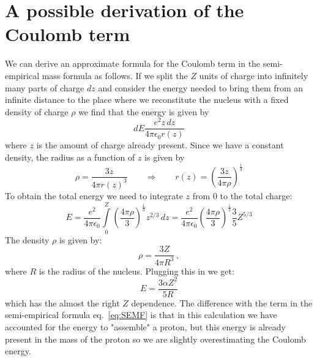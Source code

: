 \documentclass[12pt]{article}
\begin{document}
\section{A possible derivation of the Coulomb term}
We can derive an approximate formula for the Coulomb term in the semi-empirical mass formula as follows. If we split the $Z$ units of charge into infinitely many parts of charge $dz$ and consider the energy needed to bring them from an infinite distance to the place where we reconstitute the nucleus with a fixed density of charge $\rho$ we find that the energy is given by 
\[dE\frac{e^2 z\,dz}{4\pi\epsilon_0 r(z)}\]
where $z$ is the amount of charge already present. Since we have a constant density, the radius as a function of $z$ is given by
\[\rho=\frac{3 z}{4\pi r(z)^3}\qquad \Rightarrow \qquad r(z)=\left(\frac{3z}{4\pi\rho}\right)^{\frac{1}{3}}\]
To obtain the total energy we need to integrate $z$ from 0 to the total charge:
\[E=\frac{e^2}{4\pi\epsilon_0}\int\limits_0^{Z}\left(\frac{4\pi\rho}{3}\right)^{\frac{1}{3}}z^{2/3}\,dz=\frac{e^2}{4\pi\epsilon_0} \left(\frac{4\pi\rho}{3}\right)^{\frac{1}{3}}\frac{3}{5}Z^{5/3}\] 
The density $\rho$ is given by:
\[\rho=\frac{3Z}{4\pi R^3}\,,\]
where $R$ is the radius of the nucleus. Plugging this in we get:
\[E=\frac{3\alpha Z^2}{5 R}\] 
which has the almost the right $Z$ dependence. The difference with the term in the semi-empirical formula eq.~\ref{eq:SEMF} is that in this calculation we have accounted for the energy to "assemble" a proton, but this energy is already present in the mass of the proton so we are slightly overestimating the Coulomb energy.   






\end{document}
